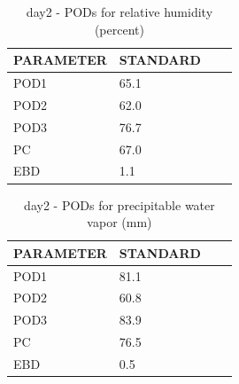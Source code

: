 \begin{table}[p!]
\begin{center}
\begin{tabular}{|l|l|l|l|}
\hline
\multicolumn{1}{|c|}{\cellcolor[HTML]{C0C0C0}\textbf{PARAMETER}} & \multicolumn{1}{c|}{\cellcolor[HTML]{C0C0C0}\textbf{STANDARD}} \\
\hline
\cellcolor[HTML]{C0C0C0}POD1  & 65.1                                \\
\cellcolor[HTML]{C0C0C0}POD2  & 62.0                                \\
\cellcolor[HTML]{C0C0C0}POD3  & 76.7                                \\
\cellcolor[HTML]{C0C0C0}PC    & 67.0                                  \\
\cellcolor[HTML]{C0C0C0}EBD   & 1.1                                 \\
\hline
\end{tabular}
\caption{day2 - PODs for relative humidity (percent)}
\label{tab:podrh:day2}
\end{center}
\end{table}
\begin{table}[p!]
\begin{center}
\begin{tabular}{|l|l|l|l|}
\hline
\multicolumn{1}{|c|}{\cellcolor[HTML]{C0C0C0}\textbf{PARAMETER}} & \multicolumn{1}{c|}{\cellcolor[HTML]{C0C0C0}\textbf{STANDARD}} \\
\hline
\cellcolor[HTML]{C0C0C0}POD1  & 81.1                                \\
\cellcolor[HTML]{C0C0C0}POD2  & 60.8                                \\
\cellcolor[HTML]{C0C0C0}POD3  & 83.9                                \\
\cellcolor[HTML]{C0C0C0}PC    & 76.5                                  \\
\cellcolor[HTML]{C0C0C0}EBD   & 0.5                                 \\
\hline
\end{tabular}
\caption{day2 - PODs for precipitable water vapor (mm)}
\label{tab:podpwv:day2}
\end{center}
\end{table}
